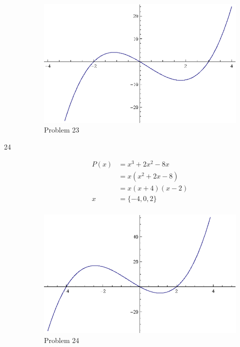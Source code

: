 \documentclass{exam}
\begin{document}
\begin{description}
      \begin{figure}[H]
        \centering
        \includegraphics[scale=0.9]{problem23.eps}
        \caption*{Problem 23}
      \end{figure}

    \item[24] 
      \begin{align*}
        P(x) &= x^3 + 2x^2 - 8x \\
             &= x(x^2 + 2x - 8) \\
             &= x(x + 4)(x - 2) \\
        x    &= \{ -4, 0, 2 \} \\
      \end{align*}
      
      \begin{figure}[H]
        \centering
        \includegraphics[scale=0.9]{problem24.eps}
        \caption*{Problem 24}
      \end{figure}


\end{description}
\end{document}
